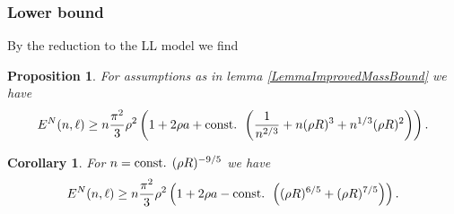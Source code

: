 \documentclass{beamer}[10]
\newtheorem{mproposition}{Proposition}
\newtheorem{mcorollary}{Corollary}
\begin{document}
\begin{frame}
	\frametitle{Lower bound}
	\begin{block}{}
	\small	By the reduction to the LL model we find 
		\begin{mproposition}\label{PropositionLowerBoundSpecN}
			For assumptions as in lemma \ref{LemmaImprovedMassBound} we have \begin{equation}
			E^N(n,\ell)\geq n\frac{\pi^2}{3}\rho^2\left(1+2\rho a+\textnormal{const. }\left(\frac{1}{n^{2/3}}+n(\rho R)^3+n^{1/3}(\rho R)^2\right)\right).
			\end{equation}
		\end{mproposition}
		\begin{mcorollary} \label{CorollaryLowerBoundSpecN}
			For $ n=\textnormal{const. } (\rho R)^{-9/5} $ we have 
			\begin{equation}
			E^N(n,\ell)\geq n\frac{\pi^2}{3}\rho^2\left(1+2\rho a-\textnormal{const. }\left((\rho R)^{6/5}+(\rho R)^{7/5}\right)\right).
			\end{equation}
		\end{mcorollary}
	\end{block}	
\end{frame}
\end{document}
